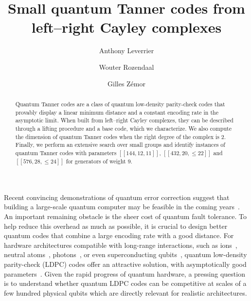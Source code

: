 \documentclass[a4paper,onecolumn,11pt]{quantumarticle}
\begin{document}
\title{Small quantum Tanner codes from left--right Cayley complexes}

\author{Anthony Leverrier}

\author{Wouter Rozendaal}


\author{Gilles Z\'emor}






\maketitle

\begin{abstract}
Quantum Tanner codes are a class of quantum low-density parity-check codes that provably display a linear minimum distance and a constant encoding rate in the asymptotic limit. 
When built from left--right Cayley complexes, they can be described through a lifting procedure and a base code,  which we characterize. We also compute the dimension of quantum Tanner codes when the right degree of the complex is 2.
Finally, we perform an extensive search over small groups and identify instances of quantum Tanner codes with parameters $[[144,12,11]]$, $[[432,20,\leq 22]]$ and $[[576,28,\leq 24]]$ for generators of weight 9.
\end{abstract}





Recent convincing demonstrations of quantum error correction suggest that building a large-scale quantum computer may be feasible in the coming years~\cite{goo25, PNH25}. An important remaining obstacle is the sheer cost of quantum fault tolerance. To help reduce this overhead as much as possible, it is crucial to design better quantum codes that combine a large encoding rate with a good distance. For hardware architectures compatible with long-range interactions, such as ions~\cite{MK13}, neutral atoms~\cite{SWM10,HBS20}, photons~\cite{OFV09}, or even superconducting qubits~\cite{BCG24}, quantum low-density parity-check (LDPC) codes offer an attractive solution, with asymptotically good parameters~\cite{PK22, LZ22, DHL23}.  Given the rapid progress of quantum hardware, a pressing question is to understand whether quantum LDPC codes can be competitive at scales of a few hundred physical qubits which are directly relevant for realistic architectures.\\
\end{document}
